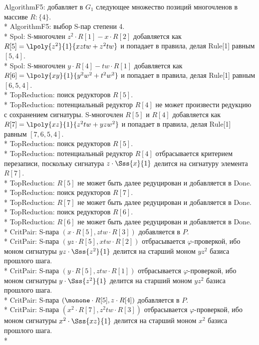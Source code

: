 AlgorithmF5: добавляет в $G_{1}$ следующее множество позиций многочленов в массиве $R: \{4\}$.\\*
AlgorithmF5: выбор S-пар степени 4.\\*
Spol: S-многочлен $z^{2}\cdot R[1] - x\cdot R[2]$ добавляется как $R[5]=\lpoly{z^{2}}{1}{xztw+z^{2}tw}$ и попадает в правила, делая Rule[1] равным $[5, 4]$.\\*
Spol: S-многочлен $y\cdot R[4] - tw\cdot R[1]$ добавляется как $R[6]=\lpoly{xy}{1}{y^{2}w^{2}+t^{2}w^{2}}$ и попадает в правила, делая Rule[1] равным $[6, 5, 4]$.\\*
TopReduction: поиск редукторов $R[5]$.\\*
TopReduction: потенциальный редуктор $R[4]$ не может произвести редукцию с сохранением сигнатуры. S-многочлен $R[5]$ и $R[4]$ добавляется как $R[7]=\lpoly{xz}{1}{z^{2}tw+yzw^{2}}$ и попадает в правила, делая Rule[1] равным $[7, 6, 5, 4]$.\\*
TopReduction: поиск редукторов $R[5]$.\\*
TopReduction: потенциальный редуктор $R[4]$ отбрасывается критерием перезаписи, поскольку сигнатура $z\cdot\Sss{x}{1}$ делится на сигнатуру элемента $R[7]$.\\*
TopReduction: $R[5]$ не может быть далее редуцирован и добавляется в Done.\\*
TopReduction: поиск редукторов $R[7]$.\\*
TopReduction: $R[7]$ не может быть далее редуцирован и добавляется в Done.\\*
TopReduction: поиск редукторов $R[6]$.\\*
TopReduction: $R[6]$ не может быть далее редуцирован и добавляется в Done.\\*
CritPair: S-пара $(x\cdot R[5],ztw\cdot R[3])$ добавляется в $P$.\\*
CritPair: S-пара $(yz\cdot R[5],xtw\cdot R[2])$  отбрасывается $\varphi$-проверкой, ибо моном сигнатуры $yz\cdot\Sss{z^{2}}{1}$ делится на старший моном $yz^{2}$ базиса прошлого шага.\\*
CritPair: S-пара $(y\cdot R[5],ztw\cdot R[1])$  отбрасывается $\varphi$-проверкой, ибо моном сигнатуры $y\cdot\Sss{z^{2}}{1}$ делится на старший моном $yz^{2}$ базиса прошлого шага.\\*
CritPair: S-пара $(\monone\cdot R[5],z\cdot R[4])$ добавляется в $P$.\\*
CritPair: S-пара $(x^{2}\cdot R[7],z^{2}tw\cdot R[3])$  отбрасывается $\varphi$-проверкой, ибо моном сигнатуры $x^{2}\cdot\Sss{xz}{1}$ делится на старший моном $x^{2}$ базиса прошлого шага.\\*
